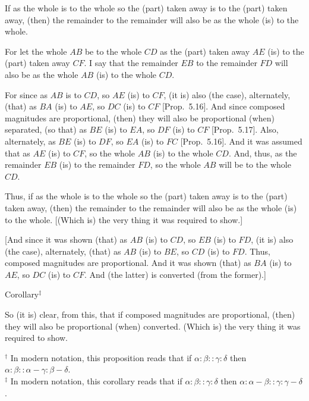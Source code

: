 \begin{Parallel}{}{}
{If as the whole is to the whole so the (part) taken
away is to the (part) taken away, (then) the remainder to the remainder will
also be as the whole (is) to the whole.

\epsfysize=0.6in
\centerline{}

For let the whole $AB$ be to the whole $CD$ as the (part) taken away $AE$
(is) to the (part) taken away $CF$. I say that the remainder $EB$
to the remainder $FD$ will also be as the whole $AB$ (is) to the whole $CD$.

For since as $AB$ is to $CD$, so $AE$ (is) to $CF$, (it is) also (the case), alternately, 
(that) as $BA$ (is)
to $AE$, so $DC$ (is) to $CF$ [Prop.~5.16].
And since composed magnitudes are proportional, (then) they will also
be proportional (when) separated, (so that) as $BE$ (is) to $EA$, so $DF$ (is)
to $CF$ [Prop.~5.17].
Also, alternately, as $BE$ (is) to $DF$, so $EA$ (is) to $FC$ [Prop.~5.16]. And it was assumed that as
$AE$ (is) to $CF$, so the whole $AB$ (is) to the whole $CD$. And, thus,  as the
remainder $EB$ (is) to the remainder $FD$, so the whole $AB$ will be to the
whole $CD$.

Thus, if as the whole is to the whole so the (part) taken
away is to the (part) taken away, (then) the remainder to the remainder will
also be as the whole (is) to the whole. [(Which is) the very thing it was required to show.]

\mbox{[}And since it was shown (that) as $AB$ (is) to $CD$, so $EB$ (is) to $FD$, (it is)
also (the case), alternately, (that) as $AB$ (is) to $BE$, so $CD$ (is) to $FD$. 
Thus, composed magnitudes are proportional. And it was shown
(that) as $BA$ (is) to $AE$, so $DC$ (is) to $CF$. And (the latter) is converted (from the former).]\\

\begin{center}
{\large Corollary}$^\ddag$
\end{center}\vspace*{-7pt}

So (it is) clear, from this, that if composed magnitudes are proportional,
 (then) they will also be proportional (when) converted.
(Which is) the very thing it was required to show.}
\end{Parallel}
{\footnotesize \noindent$^\dag$ In modern notation, this proposition
reads that if $\alpha:\beta::\gamma:\delta$ then
$\alpha:\beta::\alpha-\gamma:\beta-\delta$.\\[0.5ex]
$^\ddag$ In modern notation, this corollary reads
that if $\alpha:\beta::\gamma:\delta$ then $\alpha:\alpha-\beta::\gamma:\gamma-\delta$.}

